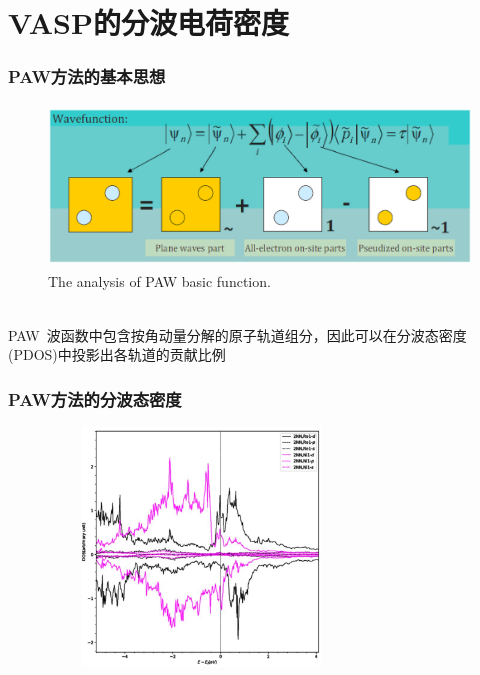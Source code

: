 \documentclass[cjk,slidestop,handout,compress,mathserif,blue]{beamer}	%
\begin{document}
\section{\rm{VASP}的分波电荷密度}
\frame
{
	\frametitle{\textrm{PAW}方法的基本思想}
	\vspace{10pt}
\begin{figure}[h!]
\centering
\vspace*{-0.18in}
\includegraphics[height=1.7in,width=4.in,viewport=30 210 570 440,clip]{Figures/PAW_projector.eps}
\caption{\small \textrm{The analysis of PAW basic function.}}%
\label{PAW_baisc}
\end{figure}
{\fontsize{7.2pt}{4.2pt}}\\
\textrm{PAW}~波函数中包含按角动量分解的原子轨道组分，因此可以在分波态密度(\textrm{PDOS})中投影出各轨道的贡献比例
}

\frame
{
	\frametitle{\textrm{PAW}方法的分波态密度}
\begin{figure}[h!]
\centering
\includegraphics[height=2.5in,width=3.2in,viewport=0 0 420 400,clip]{Figures/Ni_Re-1.jpg}
\caption{\fontsize{7.2pt}{4.2pt}}%
\label{Ni-Re-DOS}
\end{figure} 
}
\end{document}

